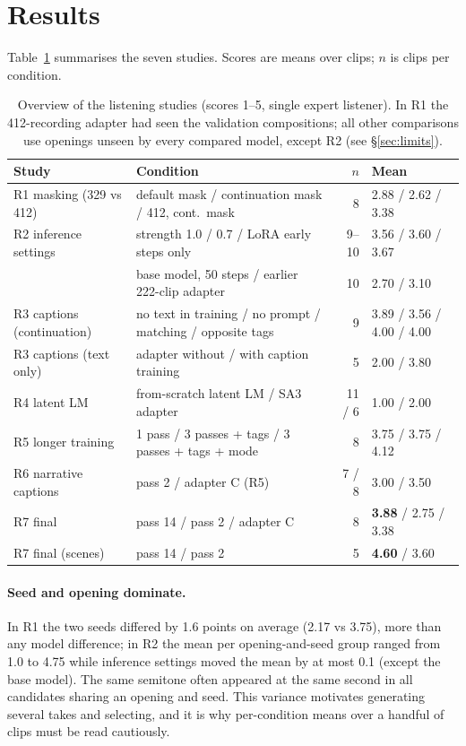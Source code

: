 \documentclass[11pt]{article}
\begin{document}
\section{Results}\label{sec:results}

Table~\ref{tab:studies} summarises the seven studies. Scores are means over clips; $n$ is clips per condition.

\begin{table}[t]
\centering
\small
\begin{tabular}{@{}p{3.3cm}p{6.4cm}rp{2.7cm}@{}}
\toprule
Study & Condition & $n$ & Mean \\
\midrule
R1 masking (329 vs 412) & default mask / continuation mask / 412, cont.\ mask & 8 & 2.88 / 2.62 / 3.38 \\
R2 inference settings & strength 1.0 / 0.7 / LoRA early steps only & 9--10 & 3.56 / 3.60 / 3.67 \\
 & base model, 50 steps / earlier 222-clip adapter & 10 & 2.70 / 3.10 \\
R3 captions (continuation) & no text in training / no prompt / matching / opposite tags & 9 & 3.89 / 3.56 / 4.00 / 4.00 \\
R3 captions (text only) & adapter without / with caption training & 5 & 2.00 / 3.80 \\
R4 latent LM & from-scratch latent LM / SA3 adapter & 11 / 6 & 1.00 / 2.00 \\
R5 longer training & 1 pass / 3 passes + tags / 3 passes + tags + mode & 8 & 3.75 / 3.75 / 4.12 \\
R6 narrative captions & pass 2 / adapter C (R5) & 7 / 8 & 3.00 / 3.50 \\
R7 final & pass 14 / pass 2 / adapter C & 8 & \textbf{3.88} / 2.75 / 3.38 \\
R7 final (scenes) & pass 14 / pass 2 & 5 & \textbf{4.60} / 3.60 \\
\bottomrule
\end{tabular}
\caption{Overview of the listening studies (scores 1--5, single expert listener). In R1 the 412-recording adapter had seen the validation compositions; all other comparisons use openings unseen by every compared model, except R2 (see \S\ref{sec:limits}).}
\label{tab:studies}
\end{table}

\paragraph{Seed and opening dominate.} In R1 the two seeds differed by 1.6 points on average (2.17 vs 3.75),
more than any model difference; in R2 the mean per opening-and-seed group ranged from 1.0 to 4.75 while
inference settings moved the mean by at most 0.1 (except the base model). The same semitone often appeared at the
same second in all candidates sharing an opening and seed. This variance motivates generating several takes and
selecting, and it is why per-condition means over a handful of clips must be read cautiously.
\end{document}
